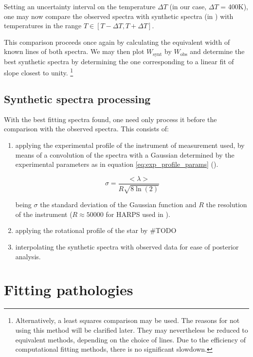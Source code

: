 \documentclass{aa}
\begin{document}
Setting an uncertainty interval on the temperature $\Delta T$  (in our case,
$\Delta T$ = 400K), one may now compare the observed spectra with synthetic
spectra (in \cite{laverny_ambre_2012}) with temperatures in the range $T\in [T - \Delta T, T + \Delta T]$.

This comparison proceeds once again by calculating the equivalent width of known
lines of both spectra. We may then plot $W_\text{synt}$ by $W_\text{obs}$ and
determine the best synthetic spectra by determining the one
corresponding to a linear fit of slope closest to unity. \footnote{Alternatively, a least squares
  comparison may be used. The reasons for not using this method will be
  clarified later. They may nevertheless be reduced to equivalent methods,
  depending on the choice of lines. Due to the efficiency of computational
  fitting methods, there is no significant slowdown.}


\subsection{Synthetic spectra processing}

With the best fitting spectra found, one need only process it before the comparison
with the observed spectra. This consists of:

\begin{enumerate}
\item applying the experimental profile of
  the instrument of measurement used, by means of a convolution of the spectra
  with a Gaussian determined by the experimental parameters as in equation
  \ref{eq:exp_profile_params} (\cite{monteiro_sebenta_2019}).

  \begin{equation}
    \label{eq:exp_profile_params}
    \sigma = \frac{<\lambda>}{R \sqrt{8 \ln (2)}}
  \end{equation}

  being $\sigma$ the standard deviation of the Gaussian function and $R$ the
  resolution of the instrument ($R \approx 50000$ for HARPS used in \cite{tsantaki_deriving_2013}).

\item applying the rotational profile of the star by \#TODO
\item interpolating the synthetic spectra with observed data for ease of
  posterior analysis. 
\end{enumerate}


\section{Fitting pathologies}
\end{document}
